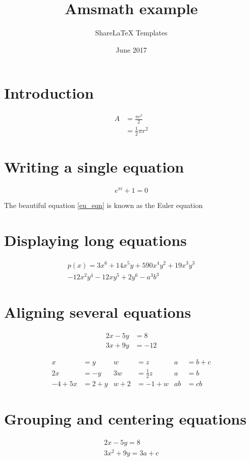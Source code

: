 \documentclass{article}
\title{Amsmath example}
\author{ShareLaTeX Templates}
\date{June 2017}
\begin{document}
\maketitle
\section{Introduction}

\begin{equation} \label{eq1}
\begin{split}
A & = \frac{\pi r^2}{2} \\
 & = \frac{1}{2} \pi r^2
\end{split}
\end{equation}

\section{Writing a single equation}

\begin{equation} \label{eu_eqn}
e^{\pi i} + 1 = 0
\end{equation}
 
The beautiful equation \ref{eu_eqn} is known as the Euler equation

\section{Displaying long equations}

\begin{multline*}
p(x) = 3x^6 + 14x^5y + 590x^4y^2 + 19x^3y^3\\ 
- 12x^2y^4 - 12xy^5 + 2y^6 - a^3b^3
\end{multline*}

\section{Aligning several equations}

\begin{align*} 
2x - 5y &=  8 \\ 
3x + 9y &=  -12
\end{align*}

\begin{align*}
x&=y           &  w &=z              &  a&=b+c\\
2x&=-y         &  3w&=\frac{1}{2}z   &  a&=b\\
-4 + 5x&=2+y   &  w+2&=-1+w          &  ab&=cb
\end{align*}

\section{Grouping and centering equations}

\begin{gather*} 
2x - 5y =  8 \\ 
3x^2 + 9y =  3a + c
\end{gather*}
\end{document}
